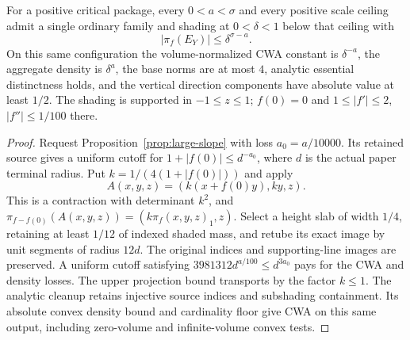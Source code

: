 \begin{lemma}
\label{lem:normalized-small-twisted-projection}
\leanok
{}
For a positive critical package, every $0<a<\sigma$ and every
positive scale ceiling admit a single ordinary family and shading at
$0<\delta<1$ below that ceiling with
\[
  |\pi_f(E_Y)|\leq\delta^{\sigma-a}.
\]
On this same configuration the volume-normalized CWA constant is
$\delta^{-a}$, the aggregate density is $\delta^a$, the base norms
are at most $4$, analytic essential distinctness holds, and the
vertical direction components have absolute value at least $1/2$.
The shading is supported in $-1\leq z\leq1$; $f(0)=0$ and
$1\leq|f'|\leq2$, $|f''|\leq1/100$ there.
\end{lemma}
\begin{proof}
\leanok
Request Proposition~\ref{prop:large-slope} with loss $a_0=a/10000$.
Its retained source gives a uniform cutoff for
$1+|f(0)|\leq d^{-a_0}$, where $d$ is the actual paper terminal radius.
Put $k=1/(4(1+|f(0)|))$ and apply
\[
 A(x,y,z)=(k(x+f(0)y),ky,z).
\]
This is a contraction with determinant $k^2$, and
$\pi_{f-f(0)}(A(x,y,z))=(k\pi_f(x,y,z)_1,z)$.
Select a height slab of width $1/4$, retaining at least $1/12$ of
indexed shaded mass, and retube its exact image by unit segments of
radius $12d$. The original indices and supporting-line images are
preserved. A uniform cutoff satisfying
$3981312d^{a/100}\leq d^{3a_0}$ pays for the CWA and density losses.
The upper projection bound transports by the factor $k\leq1$.
The analytic cleanup retains injective source indices and subshading
containment. Its absolute convex density bound and cardinality floor
give CWA on this same output, including zero-volume and infinite-volume
convex tests.
\end{proof}


